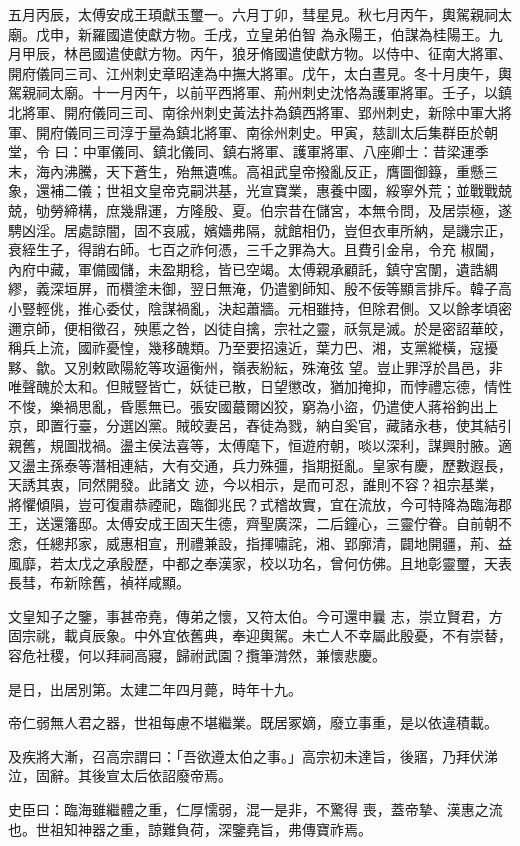 \begin{pinyinscope}
 五月丙辰，太傅安成王頊獻玉璽一。六月丁卯，彗星見。秋七月丙午，輿駕親祠太廟。戊申，新羅國遣使獻方物。壬戌，立皇弟伯智
 為永陽王，伯謀為桂陽王。九月甲辰，林邑國遣使獻方物。丙午，狼牙脩國遣使獻方物。以侍中、征南大將軍、開府儀同三司、江州刺史章昭達為中撫大將軍。戊午，太白晝見。冬十月庚午，輿駕親祠太廟。十一月丙午，以前平西將軍、荊州刺史沈恪為護軍將軍。壬子，以鎮北將軍、開府儀同三司、南徐州刺史黃法抃為鎮西將軍、郢州刺史，新除中軍大將軍、開府儀同三司淳于量為鎮北將軍、南徐州刺史。甲寅，慈訓太后集群臣於朝堂，令
 曰：中軍儀同、鎮北儀同、鎮右將軍、護軍將軍、八座卿士：昔梁運季末，海內沸騰，天下蒼生，殆無遺噍。高祖武皇帝撥亂反正，膺圖御籙，重懸三象，還補二儀；世祖文皇帝克嗣洪基，光宣寶業，惠養中國，綏寧外荒；並戰戰兢兢，劬勞締構，庶幾鼎運，方隆殷、夏。伯宗昔在儲宮，本無令問，及居崇極，遂騁凶淫。居處諒闇，固不哀戚，嬪嬙弗隔，就館相仍，豈但衣車所納，是譏宗正，衰絰生子，得誚右師。七百之祚何憑，三千之罪為大。且費引金帛，令充
 椒閫，內府中藏，軍備國儲，未盈期稔，皆已空竭。太傅親承顧託，鎮守宮闈，遺誥綢繆，義深垣屏，而欑塗未御，翌日無淹，仍遣劉師知、殷不佞等顯言排斥。韓子高小豎輕佻，推心委仗，陰謀禍亂，決起蕭牆。元相雖持，但除君側。又以餘孝頃密邇京師，便相徵召，殃慝之咎，凶徒自擒，宗社之靈，祅氛是滅。於是密詔華皎，稱兵上流，國祚憂惶，幾移醜類。乃至要招遠近，葉力巴、湘，支黨縱橫，寇擾黟、歙。又別敕歐陽紇等攻逼衡州，嶺表紛紜，殊淹弦
 望。豈止罪浮於昌邑，非唯聲醜於太和。但賊豎皆亡，妖徒已散，日望懲改，猶加掩抑，而悖禮忘德，情性不悛，樂禍思亂，昏慝無已。張安國蕞爾凶狡，窮為小盜，仍遣使人蔣裕鉤出上京，即置行臺，分選凶黨。賊皎妻呂，舂徒為戮，納自奚官，藏諸永巷，使其結引親舊，規圖戕禍。盪主侯法喜等，太傅麾下，恒遊府朝，啖以深利，謀興肘腋。適又盪主孫泰等潛相連結，大有交通，兵力殊彊，指期挺亂。皇家有慶，歷數遐長，天誘其衷，同然開發。此諸文
 迹，今以相示，是而可忍，誰則不容？祖宗基業，將懼傾隕，豈可復肅恭禋祀，臨御兆民？式稽故實，宜在流放，今可特降為臨海郡王，送還籓邸。太傅安成王固天生德，齊聖廣深，二后鐘心，三靈佇眷。自前朝不悆，任總邦家，威惠相宣，刑禮兼設，指揮嘯詫，湘、郢廓清，闢地開疆，荊、益風靡，若太戊之承殷歷，中都之奉漢家，校以功名，曾何仿佛。且地彰靈璽，天表長彗，布新除舊，禎祥咸顯。



 文皇知子之鑒，事甚帝堯，傳弟之懷，又符太伯。今可還申曩
 志，崇立賢君，方固宗祧，載貞辰象。中外宜依舊典，奉迎輿駕。未亡人不幸屬此殷憂，不有崇替，容危社稷，何以拜祠高寢，歸祔武園？攬筆潸然，兼懷悲慶。



 是日，出居別第。太建二年四月薨，時年十九。



 帝仁弱無人君之器，世祖每慮不堪繼業。既居冢嫡，廢立事重，是以依違積載。



 及疾將大漸，召高宗謂曰：「吾欲遵太伯之事。」高宗初未達旨，後寤，乃拜伏涕泣，固辭。其後宣太后依詔廢帝焉。



 史臣曰：臨海雖繼體之重，仁厚懦弱，混一是非，不驚得
 喪，蓋帝摯、漢惠之流也。世祖知神器之重，諒難負荷，深鑒堯旨，弗傳寶祚焉。






\end{pinyinscope}
